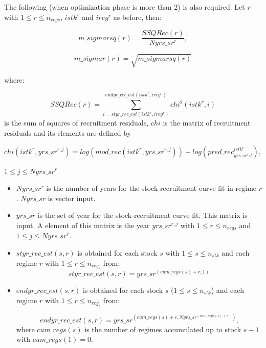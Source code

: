 \documentclass{article}
\begin{document}
The following (when optimization phase is more than 2) is also required. Let $r$ with $1\leq r \leq n_{regs}$, $istk^r$ and $ireg^r$ as before, then:

\begin{equation}
    m\_sigmarsq(r)=\dfrac{SSQRec(r)}{Nyrs\_sr^r},
\end{equation}

\begin{equation}
    m\_sigmar(r)=\sqrt{m\_sigmarsq(r)}
\end{equation}

where: 

\begin{equation}
    SSQRec(r)=\displaystyle\sum_{i=styr\_rec\_est(istk^r,ireg^r)}^{endyr\_rec\_est(istk^r,ireg^r)}chi^2(istk^r,i)
\end{equation}
is the sum of squares of recruitment residuals, $chi$ is the matrix of recruitment residuals and its elements are defined by

\begin{equation}
    chi(istk^r,yrs\_sr^{r,j}) = log(mod\_rec(istk^r,yrs\_sr^{r,j})) - log(pred\_rec^{istk^r}_{yrs\_sr^{r,j}}),
\end{equation}

$1\leq j \leq Nyrs\_sr^r$

\begin{itemize}
    \item $Nyrs\_sr^r$ is the  number of years for the stock-recruitment curve fit in regime $r$. $Nyrs\_sr$ is vector input. %
    
    \item $yrs\_sr$ is the set of year for the stock-recruitment curve fit. This  matrix is input. A element of this matrix is the year $yrs\_sr^{r,j}$ with $1\leq r \leq n_{regs}$ and $1\leq j\leq Nyrs\_sr^r$.%
    
    
    \item $styr\_rec\_est(s,r)$ is obtained for each stock $s$ with $1\leq s \leq n_{stk}$ and each regime $r$ with $1\leq r \leq n_{reg_s}$ from: 
    \begin{equation*}
        styr\_rec\_est(s,r) = yrs\_sr^{(cum\_regs(s)+r,1)}
    \end{equation*}
    
    \item $endyr\_rec\_est(s,r)$ is obtained for each stock $s$ ($1\leq s \leq n_{stk}$) and each regime $r$ with $1\leq r \leq n_{reg_s}$ from:
    
    \begin{equation*}
    endyr\_rec\_est(s,r) = yrs\_sr^{(cum\_regs(s)+r,Nyrs\_sr^{(cum\_regs(s)+r)})}.
    \end{equation*}
    where $cum\_regs(s)$ is the number of regimes accumulated up to stock $s-1$ with $cum\_regs(1)=0$.
\end{itemize}
\end{document}
